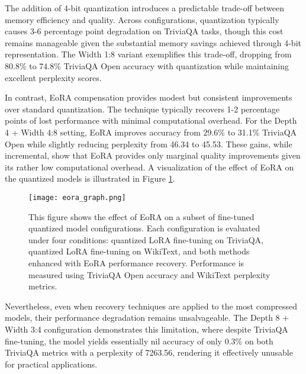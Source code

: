 The addition of 4-bit quantization introduces a predictable trade-off between memory efficiency and quality. Across configurations, quantization typically causes 3-6 percentage point degradation on TriviaQA tasks, though this cost remains manageable given the substantial memory savings achieved through 4-bit representation. The Width 1:8 variant exemplifies this trade-off, dropping from 80.8\% to 74.8\% TriviaQA Open accuracy with quantization while maintaining excellent perplexity scores.

In contrast, EoRA compensation provides modest but consistent improvements over standard quantization. The technique typically recovers 1-2 percentage points of lost performance with minimal computational overhead. For the Depth 4 + Width 4:8 setting, EoRA improves accuracy from 29.6\% to 31.1\% TriviaQA Open while slightly reducing perplexity from 46.34 to 45.53. These gains, while incremental, show that EoRA provides only marginal quality improvements given its rather low computational overhead. A visualization of the effect of EoRA on the quantized models is illustrated in Figure \ref{fig:graph_eora}.

\begin{figure}[!htbp]
    \centering
    \texttt{[image: eora\_graph.png]}
    \caption[Comparison of Quantized and EoRA Models]{This figure shows the effect of EoRA on a subset of fine-tuned quantized model configurations. Each configuration is evaluated under four conditions: quantized LoRA fine-tuning on TriviaQA, quantized LoRA fine-tuning on WikiText, and both methods enhanced with EoRA performance recovery. Performance is measured using TriviaQA Open accuracy and WikiText perplexity metrics.}
    \label{fig:graph_eora}
\end{figure}

Nevertheless, even when recovery techniques are applied to the most compressed models, their performance degradation remains unsalvageable. The Depth 8 + Width 3:4 configuration demonstrates this limitation, where despite TriviaQA fine-tuning, the model yields essentially nil accuracy of only 0.3\% on both TriviaQA metrics with a perplexity of 7263.56, rendering it effectively unusable for practical applications.